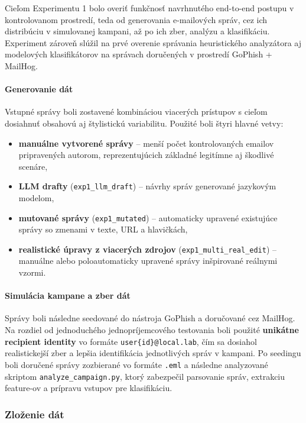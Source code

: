 \documentclass[conference]{IEEEtran}
\begin{document}
Cieľom Experimentu 1 bolo overiť funkčnosť navrhnutého end-to-end postupu v kontrolovanom prostredí, teda od generovania e-mailových správ, cez ich distribúciu v simulovanej kampani, až po ich zber, analýzu a klasifikáciu. Experiment zároveň slúžil na prvé overenie správania heuristického analyzátora aj modelových klasifikátorov na správach doručených v prostredí GoPhish + MailHog.

\paragraph{Generovanie dát}

Vstupné správy boli zostavené kombináciou viacerých prístupov s cieľom dosiahnuť obsahovú aj štylistickú variabilitu. Použité boli štyri hlavné vetvy:

\begin{itemize}
    \item \textbf{manuálne vytvorené správy} – menší počet kontrolovaných emailov pripravených autorom, reprezentujúcich základné legitímne aj škodlivé scenáre,
    \item \textbf{LLM drafty} (\texttt{exp1\_llm\_draft}) – návrhy správ generované jazykovým modelom,
    \item \textbf{mutované správy} (\texttt{exp1\_mutated}) – automaticky upravené existujúce správy so zmenami v texte, URL a hlavičkách,
    \item \textbf{realistické úpravy z viacerých zdrojov} (\texttt{exp1\_multi\_real\_edit}) – manuálne alebo poloautomaticky upravené správy inšpirované reálnymi vzormi.
\end{itemize}
\paragraph{Simulácia kampane a zber dát}

Správy boli následne seedované do nástroja GoPhish a doručované cez MailHog. Na rozdiel od jednoduchého jednopríjemcového testovania boli použité \textbf{unikátne recipient identity} vo formáte \texttt{user\{id\}@local.lab}, čím sa dosiahol realistickejší zber a lepšia identifikácia jednotlivých správ v kampani. Po seedingu boli doručené správy zozbierané vo formáte \texttt{.eml} a následne analyzované skriptom \texttt{analyze\_campaign.py}, ktorý zabezpečil parsovanie správ, extrakciu feature-ov a prípravu vstupov pre klasifikáciu.

\subsubsection*{Zloženie dát}
\end{document}
